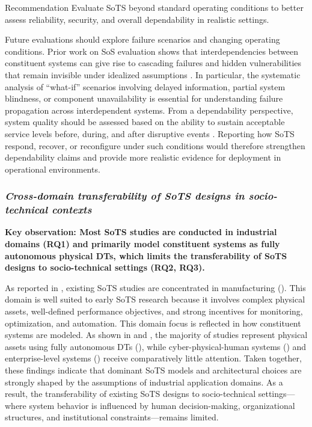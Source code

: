 \begin{recoframe}{Recommendation}
Evaluate SoTS beyond standard operating conditions to better assess reliability, security, and overall dependability in realistic settings.
\end{recoframe}

Future evaluations should explore failure scenarios and changing operating conditions. Prior work on SoS evaluation shows that interdependencies between constituent systems can give rise to cascading failures and hidden vulnerabilities that remain invisible under idealized assumptions \cite{eusgeld2011system}. In particular, the systematic analysis of ``what-if'' scenarios involving delayed information, partial system blindness, or component unavailability is essential for understanding failure propagation across interdependent systems. From a dependability perspective, system quality should be assessed based on the ability to sustain acceptable service levels before, during, and after disruptive events \cite{bukowski2016dependability}. Reporting how SoTS respond, recover, or reconfigure under such conditions would therefore strengthen dependability claims and provide more realistic evidence for deployment in operational environments.



\subsubsection{\textit{Cross-domain transferability of SoTS designs in socio-technical contexts}}

\textbf{Key observation: Most SoTS studies are conducted in industrial domains (RQ1) and primarily model constituent systems as fully autonomous physical DTs, which limits the transferability of SoTS designs to socio-technical settings (RQ2, RQ3).}

As reported in , existing SoTS studies are concentrated in manufacturing (). This domain is well suited to early SoTS research because it involves complex physical assets, well-defined performance objectives, and strong incentives for monitoring, optimization, and automation. This domain focus is reflected in how constituent systems are modeled. As shown in  and , the majority of studies represent physical assets using fully autonomous DTs (), while cyber-physical-human systems () and enterprise-level systems () receive comparatively little attention. Taken together, these findings indicate that dominant SoTS models and architectural choices are strongly shaped by the assumptions of industrial application domains. As a result, the transferability of existing SoTS designs to socio-technical settings—where system behavior is influenced by human decision-making, organizational structures, and institutional constraints—remains limited.


